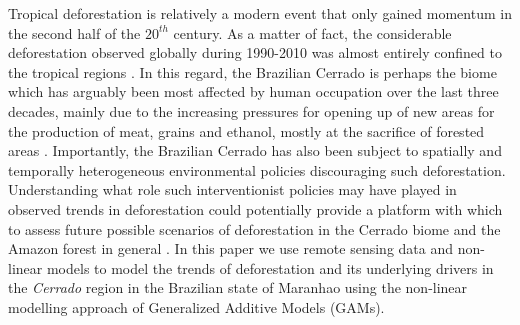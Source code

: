 
Tropical deforestation is relatively a modern event that only gained momentum in the second half of the $20^{th}$ century. As a matter of fact, the considerable deforestation observed globally during 1990-2010 was almost entirely confined to the tropical regions \citep{CULAS11}.  In this regard, the Brazilian Cerrado is perhaps the biome which has arguably been most affected by human occupation over the last three decades, mainly due to the increasing pressures for opening up of new areas for the production of meat, grains and ethanol, mostly at the sacrifice of forested areas \citep{mma_2018, bayma_sano_2015}. Importantly, the Brazilian Cerrado has also been subject to spatially and temporally heterogeneous environmental policies discouraging such deforestation.  Understanding what role such interventionist policies may have played in observed trends in deforestation could potentially provide a platform with which to assess future possible scenarios of deforestation in the Cerrado biome and the Amazon forest in general \citep{boyd_2013}. In this paper we use remote sensing data and non-linear models to model the trends of deforestation and its underlying drivers in the \textit{Cerrado} region in the Brazilian state of Maranhao using the non-linear modelling approach of Generalized Additive Models (GAMs). 

